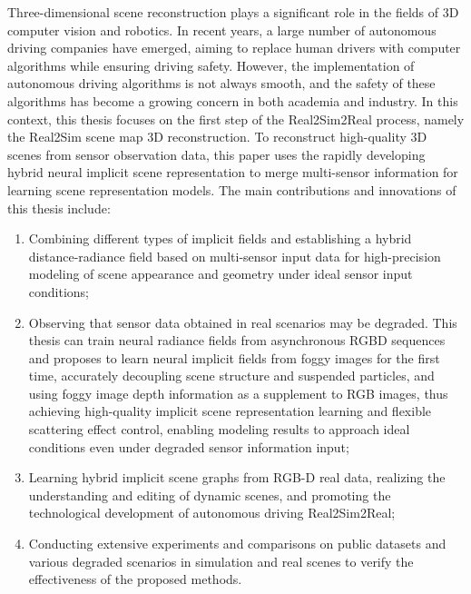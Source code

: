 \begin{abstractEn}
Three-dimensional scene reconstruction plays a significant role in the fields of 3D computer vision and robotics. In recent years, a large number of autonomous driving companies have emerged, aiming to replace human drivers with computer algorithms while ensuring driving safety. However, the implementation of autonomous driving algorithms is not always smooth, and the safety of these algorithms has become a growing concern in both academia and industry. In this context, this thesis focuses on the first step of the Real2Sim2Real process, namely the Real2Sim scene map 3D reconstruction. To reconstruct high-quality 3D scenes from sensor observation data, this paper uses the rapidly developing hybrid neural implicit scene representation to merge multi-sensor information for learning scene representation models. The main contributions and innovations of this thesis include:

\begin{enumerate}
    \item Combining different types of implicit fields and establishing a hybrid distance-radiance field based on multi-sensor input data for high-precision modeling of scene appearance and geometry under ideal sensor input conditions;
    \item Observing that sensor data obtained in real scenarios may be degraded. This thesis can train neural radiance fields from asynchronous RGBD sequences and proposes to learn neural implicit fields from foggy images for the first time, accurately decoupling scene structure and suspended particles, and using foggy image depth information as a supplement to RGB images, thus achieving high-quality implicit scene representation learning and flexible scattering effect control, enabling modeling results to approach ideal conditions even under degraded sensor information input;
    \item Learning hybrid implicit scene graphs from RGB-D real data, realizing the understanding and editing of dynamic scenes, and promoting the technological development of autonomous driving Real2Sim2Real;
    \item Conducting extensive experiments and comparisons on public datasets and various degraded scenarios in simulation and real scenes to verify the effectiveness of the proposed methods.
\end{enumerate}


\end{abstractEn}
